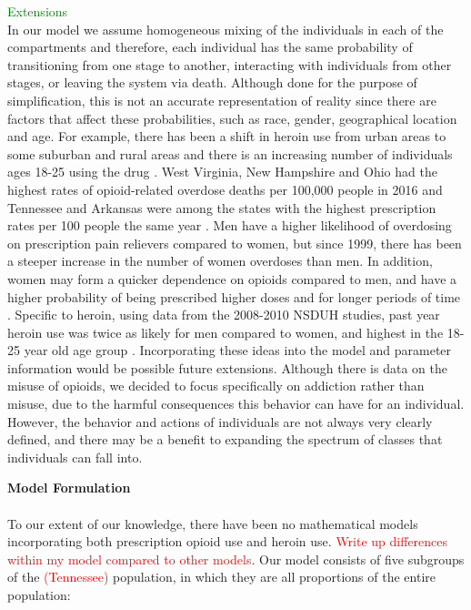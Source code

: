 \documentclass[12pt]{article}
\begin{document}
\textcolor{green}{Extensions}\\
In our model we assume homogeneous mixing of the individuals in each of the compartments and therefore, each individual has the same probability of transitioning from one stage to another, interacting with individuals from other stages, or leaving the system via death. Although done for the purpose of simplification, this is not an accurate representation of reality since there are factors that affect these probabilities, such as race, gender, geographical location and age. For example, there has been a shift in heroin use from urban areas to some suburban and rural areas and there is an increasing number of individuals ages 18-25 using the drug \cite{NIDA2}. West Virginia, New Hampshire and Ohio had the highest rates of opioid-related overdose deaths per 100,000 people in 2016 and Tennessee and Arkansas were among the states with the highest prescription rates per 100 people the same year \cite{NIH3}. Men have a higher likelihood of overdosing on prescription pain relievers compared to women, but since 1999, there has been a steeper increase in the number of women overdoses than men. In addition, women may form a quicker dependence on opioids compared to men, and have a higher probability of being prescribed higher doses and for longer periods of time \cite{CDC5}. Specific to heroin, using data from the 2008-2010 NSDUH studies, past year heroin use was twice as likely for men compared to women, and highest in the 18-25 year old age group \cite{Jones}. Incorporating these ideas into the model and parameter information would be possible future extensions. Although there is data on the misuse of opioids, we decided to focus specifically on addiction rather than misuse, due to the harmful consequences this behavior can have for an individual. However, the behavior and actions of individuals are not always very clearly defined, and there may be a benefit to expanding the spectrum of classes that individuals can fall into. 



\textbf{Model Formulation} \\ \\
To our extent of our knowledge, there have been no mathematical models incorporating both prescription opioid use and heroin use. \textcolor{red}{Write up differences within my model compared to other models.}
Our model consists of five subgroups of the \textcolor{red}{(Tennessee)} population, in which they are all proportions of the entire population: 
\end{document}
